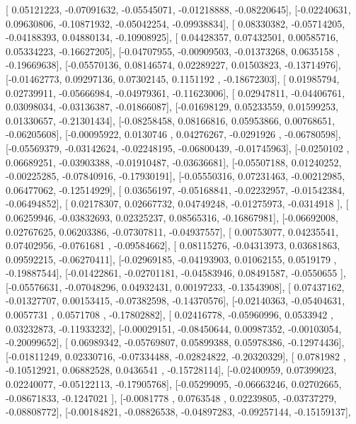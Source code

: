 \documentclass{article}
\begin{document}
       [ 0.05121223, -0.07091632, -0.05545071, -0.01218888, -0.08220645],
       [-0.02240631,  0.09630806, -0.10871932, -0.05042254, -0.09938834],
       [ 0.08330382, -0.05714205, -0.04188393,  0.04880134, -0.10908925],
       [ 0.04428357,  0.07432501,  0.00585716,  0.05334223, -0.16627205],
       [-0.04707955, -0.00909503, -0.01373268,  0.0635158 , -0.19669638],
       [-0.05570136,  0.08146574,  0.02289227,  0.01503823, -0.13714976],
       [-0.01462773,  0.09297136,  0.07302145,  0.1151192 , -0.18672303],
       [ 0.01985794,  0.02739911, -0.05666984, -0.04979361, -0.11623006],
       [ 0.02947811, -0.04406761,  0.03098034, -0.03136387, -0.01866087],
       [-0.01698129,  0.05233559,  0.01599253,  0.01330657, -0.21301434],
       [-0.08258458,  0.08166816,  0.05953866,  0.00768651, -0.06205608],
       [-0.00095922,  0.0130746 ,  0.04276267, -0.0291926 , -0.06780598],
       [-0.05569379, -0.03142624, -0.02248195, -0.06800439, -0.01745963],
       [-0.0250102 ,  0.06689251, -0.03903388, -0.01910487, -0.03636681],
       [-0.05507188,  0.01240252, -0.00225285, -0.07840916, -0.17930191],
       [-0.05550316,  0.07231463, -0.00212985,  0.06477062, -0.12514929],
       [ 0.03656197, -0.05168841, -0.02232957, -0.01542384, -0.06494852],
       [ 0.02178307,  0.02667732,  0.04749248, -0.01275973, -0.0314918 ],
       [ 0.06259946, -0.03832693,  0.02325237,  0.08565316, -0.16867981],
       [-0.06692008,  0.02767625,  0.06203386, -0.07307811, -0.04937557],
       [ 0.00753077,  0.04235541,  0.07402956, -0.0761681 , -0.09584662],
       [ 0.08115276, -0.04313973,  0.03681863,  0.09592215, -0.06270411],
       [-0.02969185, -0.04193903,  0.01062155,  0.0519179 , -0.19887544],
       [-0.01422861, -0.02701181, -0.04583946,  0.08491587, -0.0550655 ],
       [-0.05576631, -0.07048296,  0.04932431,  0.00197233, -0.13543908],
       [ 0.07437162, -0.01327707,  0.00153415, -0.07382598, -0.14370576],
       [-0.02140363, -0.05404631,  0.0057731 ,  0.0571708 , -0.17802882],
       [ 0.02416778, -0.05960996,  0.0533942 ,  0.03232873, -0.11933232],
       [-0.00029151, -0.08450644,  0.00987352, -0.00103054, -0.20099652],
       [ 0.06989342, -0.05769807,  0.05899388,  0.05978386, -0.12974436],
       [-0.01811249,  0.02330716, -0.07334488, -0.02824822, -0.20320329],
       [ 0.0781982 , -0.10512921,  0.06882528,  0.0436541 , -0.15728114],
       [-0.02400959,  0.07399023,  0.02240077, -0.05122113, -0.17905768],
       [-0.05299095, -0.06663246,  0.02702665, -0.08671833, -0.1247021 ],
       [-0.0081778 ,  0.0763548 ,  0.02239805, -0.03737279, -0.08808772],
       [-0.00184821, -0.08826538, -0.04897283, -0.09257144, -0.15159137],
\end{document}
